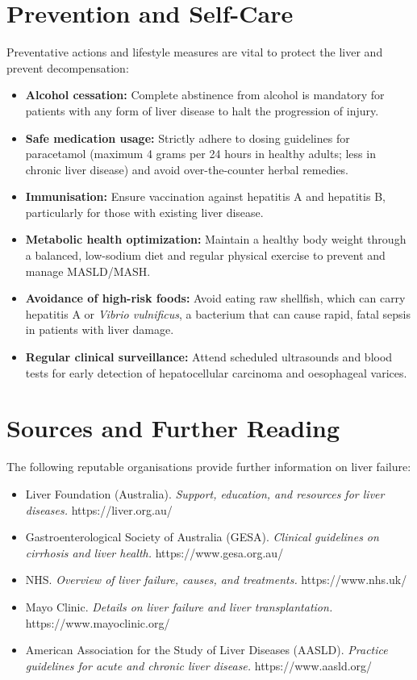 \section*{Prevention and Self-Care}
Preventative actions and lifestyle measures are vital to protect the liver and prevent decompensation:
\begin{itemize}
    \item \textbf{Alcohol cessation:} Complete abstinence from alcohol is mandatory for patients with any form of liver disease to halt the progression of injury.
    \item \textbf{Safe medication usage:} Strictly adhere to dosing guidelines for paracetamol (maximum 4 grams per 24 hours in healthy adults; less in chronic liver disease) and avoid over-the-counter herbal remedies.
    \item \textbf{Immunisation:} Ensure vaccination against hepatitis A and hepatitis B, particularly for those with existing liver disease.
    \item \textbf{Metabolic health optimization:} Maintain a healthy body weight through a balanced, low-sodium diet and regular physical exercise to prevent and manage MASLD/MASH.
    \item \textbf{Avoidance of high-risk foods:} Avoid eating raw shellfish, which can carry hepatitis A or \textit{Vibrio vulnificus}, a bacterium that can cause rapid, fatal sepsis in patients with liver damage.
    \item \textbf{Regular clinical surveillance:} Attend scheduled ultrasounds and blood tests for early detection of hepatocellular carcinoma and oesophageal varices.
\end{itemize}

\section*{Sources and Further Reading}
The following reputable organisations provide further information on liver failure:
\begin{itemize}
    \item Liver Foundation (Australia). \textit{Support, education, and resources for liver diseases.} https://liver.org.au/
    \item Gastroenterological Society of Australia (GESA). \textit{Clinical guidelines on cirrhosis and liver health.} https://www.gesa.org.au/
    \item NHS. \textit{Overview of liver failure, causes, and treatments.} https://www.nhs.uk/
    \item Mayo Clinic. \textit{Details on liver failure and liver transplantation.} https://www.mayoclinic.org/
    \item American Association for the Study of Liver Diseases (AASLD). \textit{Practice guidelines for acute and chronic liver disease.} https://www.aasld.org/
\end{itemize}
